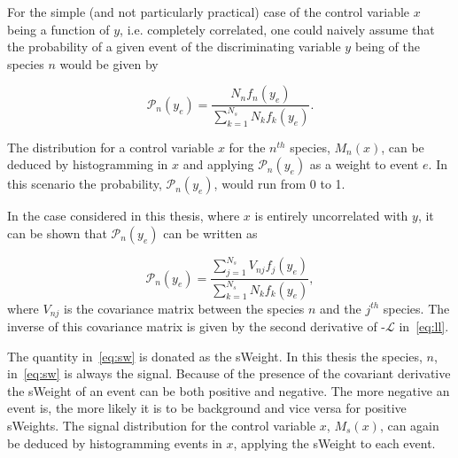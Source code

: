 For the simple (and not particularly practical) case of the control variable $x$ being a function of $y$, i.e. completely correlated, one could naively assume that the probability of a given event of the discriminating variable $y$ being of the species $n$ would be given by

\begin{equation}
  \mathcal{P}_{n} (y_{e}) = \frac{N_{n}f_{n}(y_{e})}{\sum^{N_{s}}_{k =1} N_{k}f_{k}(y_{e})}.
\end{equation}

The distribution for a control variable $x$ for the $n^{th}$ species, $M_{n}(x)$, can be deduced by histogramming in $x$ and applying $\mathcal{P}_{n} (y_{e})$ as a weight to event $e$. In this scenario the probability, $\mathcal{P}_{n} (y_{e})$, would run from 0 to 1.

In the case considered in this thesis, where $x$ is entirely uncorrelated with $y$, it can be shown that $\mathcal{P}_{n} (y_{e})$ can be written as

\begin{equation}
  \mathcal{P}_{n} (y_{e}) = \frac{\sum^{N_{s}}_{j = 1} V_{nj}f_{j}(y_{e})}{\sum^{N_{s}}_{k =1} N_{k}f_{k}(y_{e})},
  \label{eq:sw}
\end{equation}
where $V_{nj}$ is the covariance matrix between the species $n$ and the $j^{th}$ species. The inverse of this covariance matrix is given by the second derivative of -$\mathcal{L}$ in~\autoref{eq:ll}.

The quantity in~\autoref{eq:sw} is donated as the sWeight. In this thesis the species, $n$, in~\autoref{eq:sw} is always the signal. Because of the presence of the covariant derivative the sWeight of an event can be both positive and negative. The more negative an event is, the more likely it is to be background and vice versa for positive sWeights. The signal distribution for the control variable $x$, $M_{s}(x)$, can again   be deduced by histogramming events in $x$, applying the sWeight to each event. %



